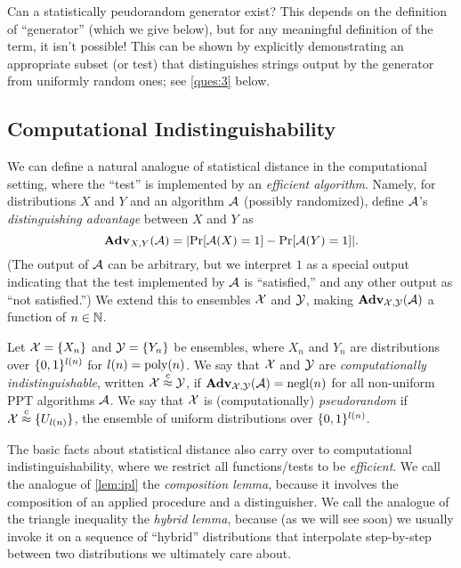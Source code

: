 \documentclass[11pt]{article}
\begin{document}
Can a statistically peudorandom generator exist?  This
depends on the definition of ``generator'' (which we give below), but
for any meaningful definition of the term, it isn't possible!  This
can be shown by explicitly demonstrating an appropriate subset (or
test) that distinguishes strings output by the generator from
uniformly random ones; see \cref{ques:3} below.

\subsection{Computational Indistinguishability}
\label{sec:comp-indist}

We can define a natural analogue of statistical distance in the
computational setting, where the ``test'' is implemented by an
\emph{efficient algorithm}.  Namely, for distributions $X$ and $Y$ and
an algorithm $\mathcal{A}$ (possibly randomized), define $\mathcal{A}$'s
\emph{distinguishing advantage} between $X$ and $Y$ as
\[ \advan_{X,Y}(\Adv) = \abs*{\Pr[\Adv(X)=1] - \Pr[\Adv(Y)=1]}. \]
(The output of $\mathcal{A}$ can be arbitrary, but we interpret $1$ as a
special output indicating that the test implemented by $\mathcal{A}$ is
``satisfied,'' and any other output as ``not satisfied.'')  We extend
this to ensembles $\mathcal{X}$ and $\mathcal{Y}$, making
$\mathbf{Adv}_{\mathcal{X},\mathcal{Y}}(\mathcal{A})$ a function of $n \in \mathbb{N}$.

\begin{definition}
  \label{def:comp-ind}
  Let $\mathcal{X} = \{X_{n}\}$ and $\mathcal{Y} = \{Y_{n}\}$ be ensembles,
  where $X_{n}$ and $Y_{n}$ are distributions over $\{0,1\}^{l(n)}$ for
  $l(n) = \operatorname{poly}(n)$.  We say that $\mathcal{X}$ and $\mathcal{Y}$ are
  \emph{computationally indistinguishable}, written
  $\mathcal{X} \stackrel{c}{\approx} \mathcal{Y}$, if $\mathbf{Adv}_{\mathcal{X},\mathcal{Y}}(\mathcal{A}) = \operatorname{negl}(n)$
  for all non-uniform PPT algorithms $\mathcal{A}$.  We say that $\mathcal{X}$ is
  (computationally) \emph{pseudorandom} if
  $\mathcal{X} \stackrel{c}{\approx} \{U_{l(n)}\}$, the ensemble of uniform
  distributions over $\{0,1\}^{l(n)}$.
\end{definition}

The basic facts about statistical distance also carry over to computational indistinguishability, where we restrict all functions/tests to be \emph{efficient}.
We call the analogue of \cref{lem:ipl} the \emph{composition lemma}, because it involves the composition of an applied procedure and a distinguisher.
We call the analogue of the triangle inequality the \emph{hybrid lemma}, because (as we will see soon) we usually invoke it on a sequence of ``hybrid'' distributions that interpolate step-by-step between two distributions we ultimately care about.
\end{document}

